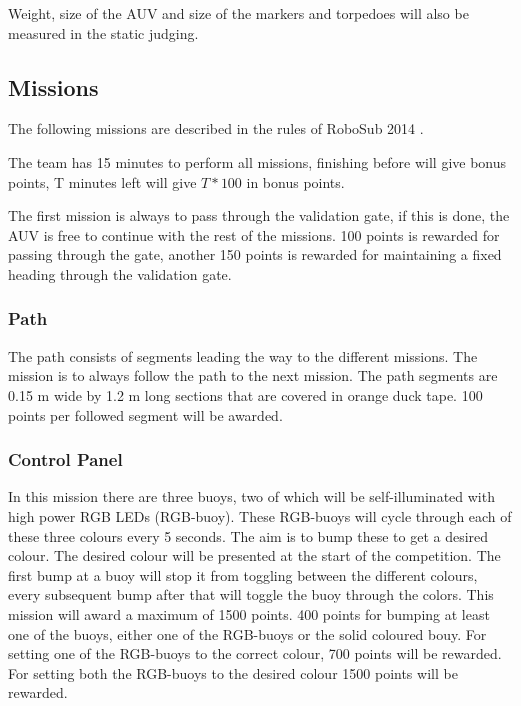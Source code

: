 Weight, size of the AUV and size of the markers and torpedoes will also be measured in the static judging. 
	\subsection{Missions}
\noindent The following missions are described in the rules of RoboSub 2014 \cite{robosubrules}.

The team has 15 minutes to perform all missions, finishing before will give bonus points, T minutes left will give $T*100$ in bonus points. 

The first mission is always to pass through the validation gate, if this is done, the AUV is free to continue with the rest of the missions. 100 points is rewarded for passing through the gate, another 150 points is rewarded for maintaining a fixed heading through the validation gate. 
		\subsubsection{Path}
\noindent The path consists of segments leading the way to the different missions. The mission is to always follow the path to the next mission. The path segments are 0.15 m wide by 1.2 m long sections that are covered in orange duck tape. 100 points per followed segment will be awarded. 
		\subsubsection{Control Panel}
\noindent In this mission there are three buoys, two of which will be self-illuminated with high power RGB LEDs (RGB-buoy). These RGB-buoys will cycle through each of these three colours every 5 seconds. The aim is to bump these to get a desired colour. The desired colour will be presented at the start of the competition. The first bump at a buoy will stop it from toggling between the different colours, every subsequent bump after that will toggle the buoy through the colors. 
This mission will award a maximum of 1500 points. 400 points for bumping at least one of the buoys, either one of the RGB-buoys or the solid coloured bouy. For setting one of the RGB-buoys to the correct colour, 700 points will be rewarded. For setting both the RGB-buoys to the desired colour 1500 points will be rewarded. 

